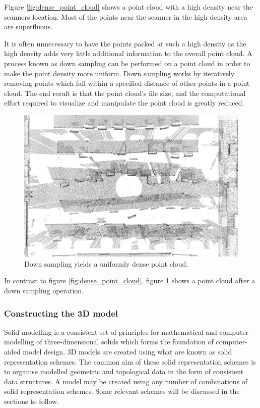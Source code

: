 \documentclass[11pt,a4paper]{report}
\begin{document}
						Figure \ref{fig:dense_point_cloud} shows a point cloud with a high density near the scanners location. Most of the points near the scanner in the high density area are superfluous.
						
						It is often unnecessary to have the points packed at such a high density as the high density adds very little additional information to the overall point cloud. A process known as down sampling can be performed on a point cloud in order to make the point density more uniform. Down sampling works by iteratively removing points which fall within a specified distance of other points in a point cloud. The end result is that the point cloud's file size, and the computational effort required to visualize and manipulate the point cloud is greatly reduced.
						\parencite{_selection_????}
						
						\begin{figure}[H]
							\centering
							\includegraphics[width=1\textwidth]{uniform_point_cloud}
							\caption[Down sampled point cloud]{Down sampling yields a uniformly dense point cloud.}
							\label{fig:uniform_point_cloud}
						\end{figure}
						
						In contrast to figure \ref{fig:dense_point_cloud}, figure \ref{fig:uniform_point_cloud} shows a point cloud after a down sampling operation.
				
			\subsubsection{Constructing the 3D model}
				Solid modelling is a consistent set of principles for mathematical and computer modelling of three-dimensional solids which forms the foundation of computer-aided model design. 
				\parencite{vadim_shapiro_solid_2001}
				3D models are created using what are known as solid representation schemes. The common aim of these solid representation schemes is to organise modelled geometric and topological data in the form of consistent data structures. A model may be created using any number of combinations of solid representation schemes. Some relevant schemes will be discussed in the sections to follow.
				
\end{document}
